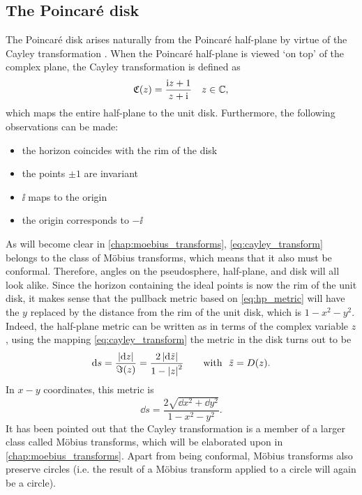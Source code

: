 \subsection{The Poincaré disk}
\label{ssec:poincare_disk}
The Poincaré disk arises naturally from the Poincaré half-plane by virtue of the Cayley transformation
. When the Poincaré half-plane is viewed `on top' of the complex plane, the Cayley transformation  is defined as
\begin{equation}
    \mathfrak{C}(z) = \frac{\mathrm{i} z + 1}{z + \mathrm{i}}\quad z \in \mathbb{C},
    \label{eq:cayley_transform}
\end{equation}
which maps the entire half-plane to the unit disk. Furthermore, the following observations can be made:
\begin{itemize}[itemsep=0.2ex,topsep=0.2ex]
    \item the horizon coincides with the rim of the disk
    \item the points \(\pm1\) are invariant
    \item \(\ii\) maps to the origin
    \item the origin corresponds to \(-\ii\)
\end{itemize}
As will become clear in \cref{chap:moebius_transforms}, \cref{eq:cayley_transform} belongs to the class of Möbius transforms, which means that it also must be conformal. Therefore, angles on the pseudosphere, half-plane, and disk will all look alike. Since the horizon containing the ideal points is now the rim of the unit disk, it makes sense that the pullback metric based on \cref{eq:hp_metric} will have the $y$ replaced by the distance from the rim of the unit disk, which is $1 - x^2 - y^2$. Indeed, the half-plane metric can be written as in terms of the complex variable $z$, using the mapping \cref{eq:cayley_transform} the metric in the disk turns out to be \cite{Needham1997}
\[
    \dd{s} = \frac{\abs{\dd{z}}}{\imaginary(z)} = \frac{2\,\abs{\dd{\tilde{z}}}}{1 - \abs{z}^2} \qquad \text{with }\ \tilde{z} = D(z).
\]
In \(x-y\) coordinates, this metric is
\begin{equation}
    \dd{s} = \frac{2\sqrt{\dd{x}^2 + \dd{y}^2}}{1 - x^2 - y^2}.
\end{equation}
It has been pointed out that the Cayley transformation is a member of a larger class called Möbius transforms, which will be elaborated upon in \cref{chap:moebius_transforms}. Apart from being conformal, Möbius transforms also preserve circles (i.e. the result of a Möbius transform applied to a circle will again be a circle). 

